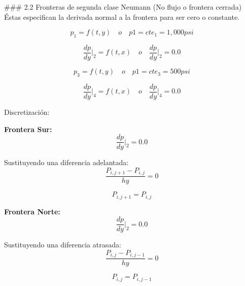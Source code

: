 \documentclass[
  letterpaper,
  DIV=11,
  numbers=noendperiod]{scrreprt}
\begin{document}
\#\#\# 2.2 Fronteras de segunda clase Neumann (No flujo o frontera
cerrada) Éstas especifican la derivada normal a la frontera para ser
cero o constante.

\[p_1=f(t,y) \quad o \quad p1=cte_1 = 1,000 psi\]

\[ \frac{dp}{dy}\big|_{ 2} = f(t,x) \quad o \quad \frac{dp}{dy}\big|_{ 2} = 0.0\]

\[p_3=f(t,y) \quad o \quad p1=cte_3 = 500 psi\]

\[ \frac{dp}{dy}\big|_{ 4} = f(t,x) \quad o \quad \frac{dp}{dy}\big|_{ 4} = 0.0\]

Discretización:

\textbf{Frontera Sur:} \[\frac{dp}{dy}\big|_{ 2} = 0.0\]

Sustituyendo una diferencia adelantada:
\[\frac{P_{i,j+1}-P_{i,j}}{hy} = 0\]

\[P_{i,j+1} = P_{i,j}\]

\textbf{Frontera Norte:} \[\frac{dp}{dy}\big|_{ 2} = 0.0\]

Sustituyendo una diferencia atrasada:
\[\frac{P_{i,j}-P_{i,j-1}}{hy} = 0\]

\[P_{i,j} = P_{i,j-1}\]
\end{document}
